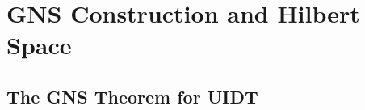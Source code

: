 \documentclass[11pt,a4paper]{article}
\theoremstyle{plain}
\theoremstyle{definition}
\begin{document}
%

\clearpage
\section{GNS Construction and Hilbert Space}
\label{app:gns}
\vspace{0.3em}
\subsection{The GNS Theorem for UIDT}
\end{document}
